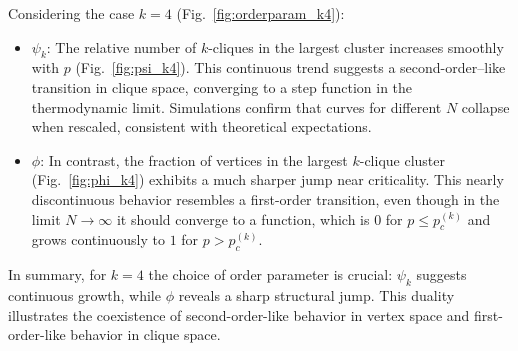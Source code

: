 Considering the case $k=4$ (Fig.~\ref{fig:orderparam_k4}):

\begin{itemize}
\item $\psi_k$:  
The relative number of $k$-cliques in the largest cluster increases smoothly with $p$ (Fig.~\ref{fig:psi_k4}).  
This continuous trend suggests a second-order–like transition in clique space, converging to a step function in the thermodynamic limit.
Simulations confirm that curves for different $N$ collapse when rescaled, consistent with theoretical expectations.

\item $\phi$:  
In contrast, the fraction of vertices in the largest $k$-clique cluster (Fig.~\ref{fig:phi_k4}) exhibits a much sharper jump near criticality.  
This nearly discontinuous behavior resembles a first-order transition, even though in the limit $N \to \infty$ it should converge to a function, which is $0$ for $p \leq p_c^{(k)}$ and grows continuously to $1$ for $p > p_c^{(k)}$.

\end{itemize}

In summary, for $k=4$ the choice of order parameter is crucial:  
$\psi_k$ suggests continuous growth, while $\phi$ reveals a sharp structural jump.  
This duality illustrates the coexistence of second-order-like behavior in vertex space and first-order-like behavior in clique space.

